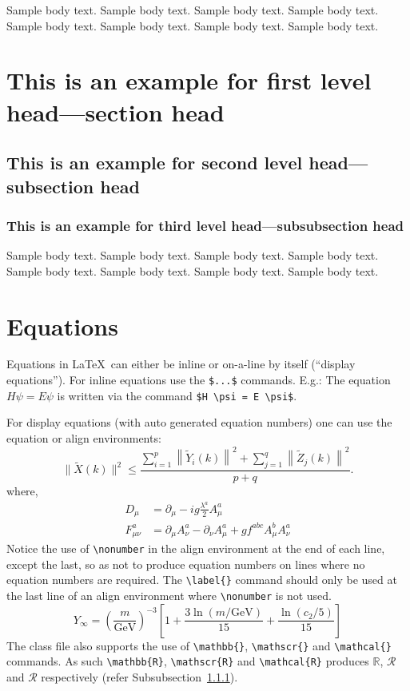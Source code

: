 \documentclass[pdflatex,sn-mathphys-num]{sn-jnl}%
\theoremstyle{thmstyleone}%
\theoremstyle{thmstyletwo}%
\theoremstyle{thmstylethree}%
\begin{document}
Sample body text. Sample body text. Sample body text. Sample body text. Sample body text. Sample body text. Sample body text. Sample body text.

\section{This is an example for first level head---section head}\label{sec3}

\subsection{This is an example for second level head---subsection head}\label{subsec2}

\subsubsection{This is an example for third level head---subsubsection head}\label{subsubsec2}

Sample body text. Sample body text. Sample body text. Sample body text. Sample body text. Sample body text. Sample body text. Sample body text. 

\section{Equations}\label{sec4}

Equations in \LaTeX\ can either be inline or on-a-line by itself (``display equations''). For
inline equations use the \verb+$...$+ commands. E.g.: The equation
$H\psi = E \psi$ is written via the command \verb+$H \psi = E \psi$+.

For display equations (with auto generated equation numbers)
one can use the equation or align environments:
\begin{equation}
\|\tilde{X}(k)\|^2 \leq\frac{\sum\limits_{i=1}^{p}\left\|\tilde{Y}_i(k)\right\|^2+\sum\limits_{j=1}^{q}\left\|\tilde{Z}_j(k)\right\|^2 }{p+q}.\label{eq1}
\end{equation}
where,
\begin{align}
D_\mu &=  \partial_\mu - ig \frac{\lambda^a}{2} A^a_\mu \nonumber \\
F^a_{\mu\nu} &= \partial_\mu A^a_\nu - \partial_\nu A^a_\mu + g f^{abc} A^b_\mu A^a_\nu \label{eq2}
\end{align}
Notice the use of \verb+\nonumber+ in the align environment at the end
of each line, except the last, so as not to produce equation numbers on
lines where no equation numbers are required. The \verb+\label{}+ command
should only be used at the last line of an align environment where
\verb+\nonumber+ is not used.
\begin{equation}
Y_\infty = \left( \frac{m}{\textrm{GeV}} \right)^{-3}
    \left[ 1 + \frac{3 \ln(m/\textrm{GeV})}{15}
    + \frac{\ln(c_2/5)}{15} \right]
\end{equation}
The class file also supports the use of \verb+\mathbb{}+, \verb+\mathscr{}+ and
\verb+\mathcal{}+ commands. As such \verb+\mathbb{R}+, \verb+\mathscr{R}+
and \verb+\mathcal{R}+ produces $\mathbb{R}$, $\mathscr{R}$ and $\mathcal{R}$
respectively (refer Subsubsection~\ref{subsubsec2}).
\end{document}
